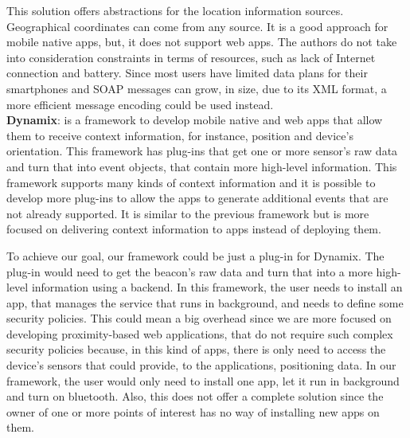 This solution offers abstractions for the location
information sources. Geographical coordinates can
come from any source. It is a good approach for
mobile native apps, but, it does not support web apps.
The authors do not take into consideration
constraints in terms of resources, such as
lack of Internet connection and battery.
Since most users have limited data plans for
their smartphones and SOAP messages can
grow, in size, due to its XML format,
a more efficient message encoding could be used
instead.
\\
\textbf{Dynamix}\cite{Carlson2012}:
is a framework to develop
mobile native and web apps that allow them to receive
context information, for instance, position and device's
orientation. This framework has plug-ins that get
one or more sensor's raw data and turn that into event
objects, that contain more high-level information.
This framework supports many kinds of context information
and it is possible to develop more plug-ins to allow the
apps to generate additional events that are not
already supported. It is similar to the previous
framework but is more focused on delivering context
information to apps instead of deploying them.

To achieve our goal, our framework could be just a
plug-in for Dynamix. The plug-in would
need to get the beacon's raw data and
turn that into a more high-level information 
using a backend. In this framework,
the user needs to install an app, that manages the service
that runs in background, and needs to define some
security policies. This could mean a big overhead since
we are more focused on developing proximity-based
web applications, that do not require such complex security
policies because, in this kind of apps, there is only need
to access the device's sensors that could provide,
to the applications, positioning data. 
In our framework, the user would only need to
install one app, let it run in background and turn on
bluetooth. Also, this does not offer a complete solution
since the owner of one or more points of interest
has no way of installing new apps on them.

